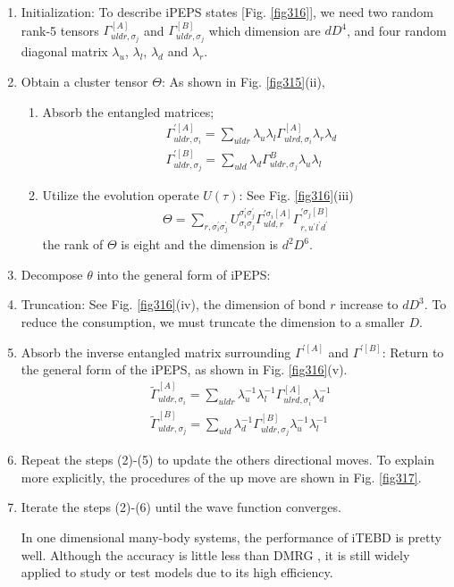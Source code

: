 \begin{enumerate}
	\item Initialization: To describe iPEPS states [Fig. \ref{fig316}], we need two random rank-5 tensors $\Gamma^{[A]}_{uldr,\sigma_j}$ and $\Gamma^{[B]}_{uldr, \sigma_j}$ which dimension are $dD^4$, and four random diagonal matrix $\lambda_{u}$, $\lambda_{l}$, $\lambda_{d}$ and $\lambda_{r}$.
	\item Obtain a cluster tensor $\Theta$: As shown in Fig. \ref{fig315}(ii),
		\begin{enumerate}
			\item Absorb the entangled matrices; 
				\begin{align}
					&\Gamma^{\prime [A]}_{uldr,\sigma_i} = \sum_{uldr}{ \lambda_{u}\lambda_{l} \Gamma^{[A]}_{ulrd,\sigma_i} \lambda_{r} \lambda_{d}} \\
					&\Gamma^{\prime [B]}_{uldr,\sigma_j} = \sum_{uld}{\lambda_{d} \Gamma^{B}_{uldr,\sigma_j} \lambda_{u}\lambda_{l}}
				\end{align}
			\item Utilize the evolution operate $U(\tau)$: See Fig. \ref{fig316}(iii)
				\begin{align}
					\Theta = \sum_{r,\sigma_i^{\prime}\sigma_j^{\prime}}{U^{\sigma_i^{\prime}\sigma_j^{\prime}}_{\sigma_i\sigma_j} \Gamma^{\prime\sigma_i [A]}_{uld,r} \Gamma^{\prime \sigma_j[B]}_{r,u^{\prime} l^{\prime} d^{\prime}}}
				\end{align}
				the rank of $\Theta$ is eight and the dimension is $d^2D^6$.
			\end{enumerate}
		\item Decompose $\theta$ into the general form of iPEPS:
		\item Truncation: See Fig. \ref{fig316}(iv), the dimension of bond $r$ increase to $dD^3$. To reduce the consumption, we must truncate the dimension to a smaller $D$.
		\item Absorb the inverse entangled matrix surrounding $\Gamma^{\prime [A]}$ and $\Gamma^{\prime [B]}$: Return to the general form of the iPEPS, as shown in Fig. \ref{fig316}(v).
				\begin{align}
					&\widetilde{\Gamma}^{[A]}_{uldr,\sigma_i} = \sum_{uldr}{ \lambda_{u}^{-1} \lambda_{l}^{-1} \Gamma^{[A]}_{ulrd,\sigma_i} \lambda_{d}^{-1}} \\
					&\widetilde{\Gamma}^{[B]}_{uldr,\sigma_j} = \sum_{uld}{\lambda_{d}^{-1} \Gamma^{[B]}_{uldr,\sigma_j} \lambda_{u}^{-1} \lambda_{l}^{-1}}
				\end{align}
			\item Repeat the steps (2)-(5) to update the others directional moves. To explain more explicitly, the procedures of the up move are shown in Fig. \ref{fig317}.
			\item Iterate the steps (2)-(6) until the wave function converges.
			
In one dimensional many-body systems, the performance of iTEBD is pretty well. Although the accuracy is little less than DMRG \cite{}, it is still widely applied to study or test models due to its high efficiency.

\end{enumerate}

